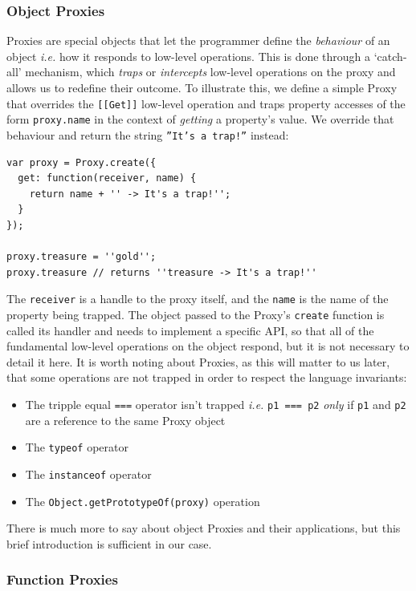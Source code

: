 \subsubsection{Object Proxies}
Proxies are special objects that let the programmer define the \emph{behaviour} of an object \emph{i.e.} how it responds to low-level operations. This is done through a `catch-all' mechanism, which \emph{traps} or \emph{intercepts} low-level operations on the proxy and allows us to redefine their outcome. To illustrate this, we define a simple Proxy that overrides the \texttt{[[Get]]} low-level operation and traps property accesses of the form \texttt{proxy.name} in the context of \emph{getting} a property's value. We override that behaviour and return the string \texttt{''It's a trap!''} instead:

\begin{lstlisting}
var proxy = Proxy.create({
  get: function(receiver, name) {
    return name + '' -> It's a trap!'';
  }
});

proxy.treasure = ''gold'';
proxy.treasure // returns ''treasure -> It's a trap!''
\end{lstlisting}

The \texttt{receiver} is a handle to the proxy itself, and the \texttt{name} is the name of the property being trapped. The object passed to the Proxy's \texttt{create} function is called its handler and needs to implement a specific API, so that all of the fundamental low-level operations on the object respond, but it is not necessary to detail it here. It is worth noting about Proxies, as this will matter to us later, that some operations are not trapped in order to respect the language invariants:

\begin{itemize}
   \item The tripple equal \texttt{===} operator isn't trapped \emph{i.e.} \texttt{p1 === p2} \emph{only} if \texttt{p1} and \texttt{p2} are a reference to the same Proxy object
   \item The \texttt{typeof} operator
   \item The \texttt{instanceof} operator
   \item The \texttt{Object.getPrototypeOf(proxy)} operation
\end{itemize}

There is much more to say about object Proxies and their applications, but this brief introduction is sufficient in our case.

\subsubsection{Function Proxies}

